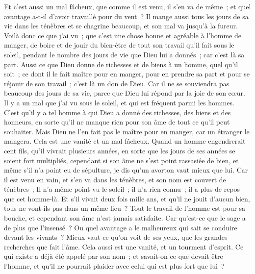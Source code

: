 \begin{multicols}{2}
Et c'est aussi un mal fâcheux, que comme il est venu, il s'en va de même~; et quel avantage a-t-il d'avoir travaillé pour du vent~?
Il mange aussi tous les jours de sa vie dans les ténèbres et se chagrine beaucoup, et son mal va jusqu'à la fureur.
Voilà donc ce que j'ai vu~; que c'est une chose bonne et agréable à l'homme de manger, de boire et de jouir du bien-être de tout son travail qu'il fait sous le soleil, pendant le nombre des jours de vie que Dieu lui a donnés~; car c'est là sa part.
Aussi ce que Dieu donne de richesses et de biens à un homme, quel qu'il soit~; ce dont il le fait maître pour en manger, pour en prendre sa part et pour se réjouir de son travail~; c'est là un don de Dieu. 
Car il ne se souviendra pas beaucoup des jours de sa vie, parce que Dieu lui répond par la joie de son cœur. 
\VerseOne{}Il y a un mal que j'ai vu sous le soleil, et qui est fréquent parmi les hommes.
C'est qu'il y a tel homme à qui Dieu a donné des richesses, des biens et des honneurs, en sorte qu'il ne manque rien pour son âme de tout ce qu'il peut souhaiter. Mais Dieu ne l'en fait pas le maître pour en manger, car un étranger le mangera. Cela est une vanité et un mal fâcheux. 
Quand un homme engendrerait cent fils, qu'il vivrait plusieurs années, en sorte que les jours de ses années se soient fort multipliés, cependant si son âme ne s'est point rassasiée de bien, et même s'il n'a point eu de sépulture, je dis qu'un avorton vaut mieux que lui.
Car il est venu en vain, et s'en va dans les ténèbres, et son nom est couvert de ténèbres~;
Il n'a même point vu le soleil~; il n'a rien connu~; il a plus de repos que cet homme-là.
Et s'il vivait deux fois mille ans, et qu'il ne jouit d'aucun bien, tous ne vont-ils pas dans un même lieu~?
Tout le travail de l'homme est pour sa bouche, et cependant son âme n'est jamais satisfaite.
Car qu'est-ce que le sage a de plus que l'insensé~? Ou quel avantage a le malheureux qui sait se conduire devant les vivants~?
Mieux vaut ce qu'on voit de ses yeux, que les grandes recherches que fait l'âme. Cela aussi est une vanité, et un tourment d'esprit.
Ce qui existe a déjà été appelé par son nom~; et savait-on ce que devait être l'homme, et qu'il ne pourrait plaider avec celui qui est plus fort que lui~? 

\end{multicols}
